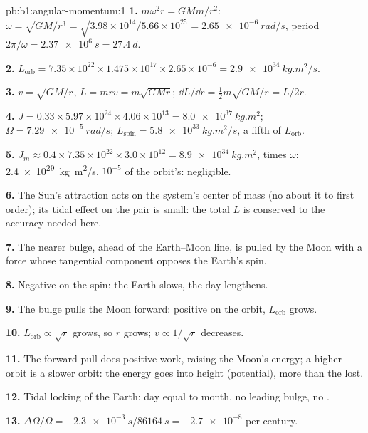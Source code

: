 \begin{solution}{pb:b1:angular-momentum:1}
\textbf{1.} $m\omega^2r = GMm/r^2$: $\omega = \sqrt{GM/r^3} = \sqrt{3.98\times
10^{14}/5.66\times10^{25}} = \qty{2.65e-6}{rad/s}$, period $2\pi/\omega =
\qty{2.37e6}{s} = \qty{27.4}{d}$.

\textbf{2.} $L_{\text{orb}} = 7.35\times10^{22} \times 1.475\times10^{17}
\times 2.65\times10^{-6} = \qty{2.9e34}{kg.m^2/s}$.

\textbf{3.} $v = \sqrt{GM/r}$, $L = mrv = m\sqrt{GMr}$; $\dd L/\dd r =
\tfrac12 m\sqrt{GM/r} = L/2r$.

\textbf{4.} $J = 0.33 \times 5.97\times10^{24} \times 4.06\times10^{13} =
\qty{8.0e37}{kg.m^2}$; $\Omega = \qty{7.29e-5}{rad/s}$; $L_{\text{spin}} =
\qty{5.8e33}{kg.m^2/s}$, a fifth of $L_{\text{orb}}$.

\textbf{5.} $J_m \approx 0.4 \times 7.35\times10^{22} \times 3.0\times10^{12} =
\qty{8.9e34}{kg.m^2}$, times $\omega$: \qty{2.4e29}{kg.m^2/s}, $10^{-5}$ of
the orbit's: negligible.

\textbf{6.} The Sun's attraction acts on the system's center of mass
(no  about it to first order); its tidal effect on the pair is
small: the total $L$ is conserved to the accuracy needed here.

\textbf{7.} The nearer bulge, ahead of the Earth--Moon line, is pulled
by the Moon with a force whose tangential component opposes the Earth's
spin.

\textbf{8.} Negative  on the spin: the Earth slows, the day
lengthens.

\textbf{9.} The bulge pulls the Moon forward: positive  on the
orbit, $L_{\text{orb}}$ grows.

\textbf{10.} $L_{\text{orb}} \propto \sqrt r$ grows, so $r$ grows; $v \propto
1/\sqrt r$ decreases.

\textbf{11.} The forward pull does positive work, raising the Moon's
energy; a higher orbit is a slower orbit: the energy goes into height
(potential), more than the  lost.

\textbf{12.} Tidal locking of the Earth: day equal to month, no leading
bulge, no .

\textbf{13.} $\Delta\Omega/\Omega = -\qty{2.3e-3}{s}/\qty{86164}{s} =
\num{-2.7e-8}$ per century.


\end{solution}
